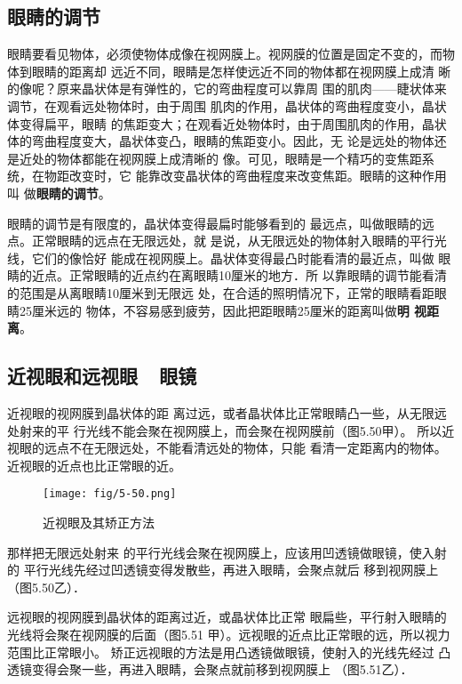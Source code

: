 \subsection{眼睛的调节}

眼睛要看见物体，必须使物体成像在视网膜上。视网膜的位置是固定不变的，而物体到眼睛的距离却
远近不同，眼睛是怎样使远近不同的物体都在视网膜上成清
晰的像呢？原来晶状体是有弹性的，它的弯曲程度可以靠周
围的肌肉——睫状体来调节，在观看远处物体时，由于周围
肌肉的作用，晶状体的弯曲程度变小，晶状体变得扁平，眼睛
的焦距变大；在观看近处物体时，由于周围肌肉的作用，晶状
体的弯曲程度变大，晶状体变凸，眼睛的焦距变小。因此，无
论是远处的物体还是近处的物体都能在视网膜上成清晰的
像。可见，眼睛是一个精巧的变焦距系统，在物距改变时，它
能靠改变晶状体的弯曲程度来改变焦距。眼睛的这种作用叫
做\textbf{眼睛的调节}。

眼睛的调节是有限度的，晶状体变得最扁时能够看到的
最远点，叫做眼睛的远点。正常眼睛的远点在无限远处，就
是说，从无限远处的物体射入眼睛的平行光线，它们的像恰好
能成在视网膜上。晶状体变得最凸时能看清的最近点，叫做
眼睛的近点。正常眼睛的近点约在离眼睛10厘米的地方．所
以靠眼睛的调节能看清的范围是从离眼睛10厘米到无限远
处，在合适的照明情况下，正常的眼睛看距眼睛25厘米远的
物体，不容易感到疲劳，因此把距眼睛25厘米的距离叫做\textbf{明
视距离}。

\subsection{近视眼和远视眼~~眼镜}

近视眼的视网膜到晶状体的距
离过远，或者晶状体比正常眼睛凸一些，从无限远处射来的平
行光线不能会聚在视网膜上，而会聚在视网膜前（图5.50甲）。
所以近视眼的远点不在无限远处，不能看清远处的物体，只能
看清一定距离内的物体。近视眼的近点也比正常眼的近。
\begin{figure}[htp]\centering
    \texttt{[image: fig/5-50.png]}
    \caption{近视眼及其矫正方法}
    \end{figure}

    那样把无限远处射来
    的平行光线会聚在视网膜上，应该用凹透镜做眼镜，使入射的
    平行光线先经过凹透镜变得发散些，再进入眼睛，会聚点就后
    移到视网膜上（图5.50乙）．

    远视眼的视网膜到晶状体的距离过近，或晶状体比正常
    眼扁些，平行射入眼睛的光线将会聚在视网膜的后面（图5.51
    甲）。远视眼的近点比正常眼的远，所以视力范围比正常眼小。
    矫正远视眼的方法是用凸透镜做眼镜，使射入的光线先经过
    凸透镜变得会聚一些，再进入眼睛，会聚点就前移到视网膜上
    （图5.51乙）．



